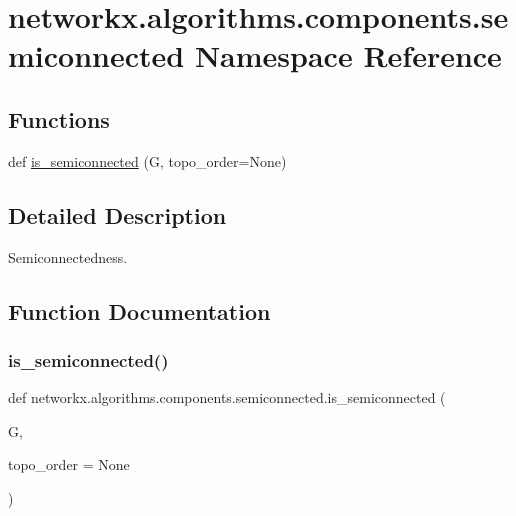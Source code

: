 \hypertarget{namespacenetworkx_1_1algorithms_1_1components_1_1semiconnected}{}\section{networkx.\+algorithms.\+components.\+semiconnected Namespace Reference}
\label{namespacenetworkx_1_1algorithms_1_1components_1_1semiconnected}
\subsection*{Functions}
\begin{DoxyCompactItemize}
\item 
def \hyperlink{namespacenetworkx_1_1algorithms_1_1components_1_1semiconnected_a0fb86e2bc80ad893912c224c1758d8e0}{is\+\_\+semiconnected} (G, topo\+\_\+order=None)
\end{DoxyCompactItemize}


\subsection{Detailed Description}
\begin{DoxyVerb}Semiconnectedness.\end{DoxyVerb}
 

\subsection{Function Documentation}
\mbox{\label{namespacenetworkx_1_1algorithms_1_1components_1_1semiconnected_a0fb86e2bc80ad893912c224c1758d8e0}} 
\subsubsection{\texorpdfstring{is\+\_\+semiconnected()}{is\_semiconnected()}}
{\footnotesize\ttfamily def networkx.\+algorithms.\+components.\+semiconnected.\+is\+\_\+semiconnected (\begin{DoxyParamCaption}\item[{}]{G,  }\item[{}]{topo\+\_\+order = {\ttfamily None} }\end{DoxyParamCaption})}

